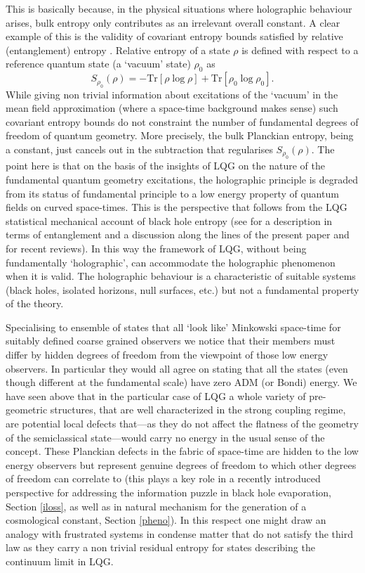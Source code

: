 \documentclass[aps, nofootinbib,superscriptaddress,12pt]{revtex4-2}
\def\be{\begin{equation}}
\def\ee{\end{equation}}
\def\Tr{\text{Tr}}
\begin{document}
This is basically because, in the physical situations where holographic behaviour arises, bulk entropy only contributes as an irrelevant overall constant.  A clear example of this is the validity of covariant entropy bounds satisfied by relative (entanglement) entropy \cite{Bousso:2014sda}. Relative entropy of a state $\rho$ is defined with respect to a reference quantum state (a `vacuum' state) $\rho_0$ as
\be\label{ree}
S_{\rho_0}(\rho) = - \Tr[\rho \log \rho] + \Tr[\rho_0 \log \rho_0].
\ee
While giving non trivial information about excitations of the `vacuum' in the mean field approximation (where a space-time background makes sense) such covariant entropy bounds do not constraint the number of fundamental degrees of freedom of quantum geometry. More precisely, the bulk Planckian entropy, being a constant, just cancels out in the subtraction that regularises $S_{\rho_0}(\rho)$. The point here is that on the basis of the insights of LQG on the nature of the  fundamental quantum geometry excitations, the holographic principle is degraded from its status of fundamental principle to a low energy property of quantum fields on curved space-times. This is the perspective that follows from the LQG statistical mechanical account of black hole entropy (see \cite{Perez:2014ura} for a description in terms of entanglement and a discussion along the lines of the present paper and \cite{DiazPolo:2011np, bayo} for recent reviews). In this way the framework of LQG, without being fundamentally `holographic', can accommodate the holographic phenomenon when it is valid. The holographic behaviour is a characteristic of suitable systems (black holes, isolated horizons, null surfaces, etc.) but not a fundamental property of the theory.

Specialising to ensemble of states that all `look like' Minkowski space-time for suitably defined coarse grained observers we notice that their members must differ by hidden degrees of freedom from the viewpoint of those low energy observers. In particular they would all agree on stating that all the states (even though different at the fundamental scale) have zero ADM (or Bondi) energy. We have seen above that in the particular case of LQG a whole variety of pre-geometric structures, that are well characterized in the strong coupling regime, are potential local defects that---as they do not affect the flatness of the geometry of the semiclassical state---would carry no energy in the usual sense of the concept. These Planckian defects in the fabric of space-time are hidden to the low energy observers but represent genuine degrees of freedom to which other degrees of freedom can correlate to (this plays a key role in a recently introduced perspective for addressing the information puzzle in black hole evaporation, Section \ref{iloss}, as well as in natural mechanism for the generation of a cosmological constant, Section \ref{pheno}).  In this respect one might draw an analogy with frustrated systems in condense matter that do not satisfy the third law as they carry a non trivial residual entropy \cite{Nachtergaele1991, fannes} for states describing the continuum limit in LQG. 
\end{document}
